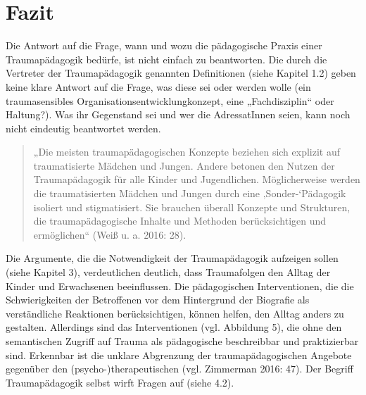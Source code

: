 \section{Fazit}
Die Antwort auf die Frage, wann und wozu die pädagogische Praxis einer Traumap{\"a}dagogik bedürfe, ist nicht einfach zu beantworten. Die durch die Vertreter der Traumap{\"a}dagogik genannten Definitionen (siehe Kapitel 1.2) geben keine klare Antwort auf die Frage, was diese sei oder werden wolle (ein traumasensibles Organisationsentwicklungkonzept, eine „Fachdisziplin“ oder Haltung?). Was ihr Gegenstand sei und wer die AdressatInnen seien, kann noch nicht eindeutig beantwortet werden.

\begin{quote}
\small{„Die meisten traumap{\"a}dagogischen Konzepte beziehen sich explizit auf traumatisierte M{\"a}dchen und Jungen. Andere betonen den Nutzen der Traumap{\"a}dagogik f{\"u}r alle Kinder und Jugendlichen. M{\"o}glicherweise werden die traumatisierten M{\"a}dchen und Jungen durch eine ‚Sonder-‘P{\"a}dagogik isoliert und stigmatisiert. Sie brauchen {\"u}berall Konzepte und Strukturen, die traumap{\"a}dagogische Inhalte und Methoden ber{\"u}cksichtigen und erm{\"o}glichen“ (Weiß u. a. 2016: 28).}
\end{quote}

Die Argumente, die die Notwendigkeit der Traumap{\"a}dagogik aufzeigen sollen (siehe Kapitel 3), verdeutlichen deutlich, dass Traumafolgen den Alltag der Kinder und Erwachsenen beeinflussen. Die pädagogischen Interventionen, die die Schwierigkeiten der Betroffenen vor dem Hintergrund der Biografie als verständliche Reaktionen berücksichtigen, können helfen, den Alltag anders zu gestalten. Allerdings sind das Interventionen (vgl. Abbildung 5), die ohne den semantischen Zugriff auf Trauma als pädagogische beschreibbar und praktizierbar sind. Erkennbar ist die unklare Abgrenzung der traumapädagogischen Angebote gegenüber den (psycho-)therapeutischen (vgl. Zimmerman 2016: 47). Der Begriff Traumapädagogik selbst wirft Fragen auf (siehe 4.2).

